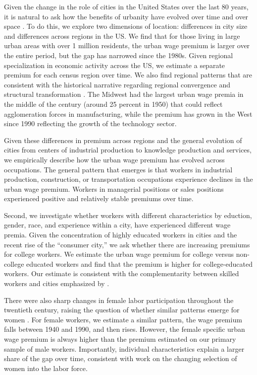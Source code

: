 \documentclass[12pt]{article}
\begin{document}
Given the change in the role of cities in the United States over the last 80 years, it is natural to ask how the benefits of urbanity have evolved over time and over space \citep*{glaeser2003rise,glaeser2004cities, glaeser2008rise,glaeser2010did}.
To do this, we explore two dimensions of location: differences in city size and differences across regions in the US. 
We find that for those living in large urban areas with over 1 million residents, the urban wage premium is larger over the entire period, but the gap has narrowed since the 1980s. 
Given regional specialization in economic activity across the US, we estimate a separate premium for each census region over time.
We also find regional patterns that are consistent with the historical narrative regarding regional convergence and structural transformation \citep{barro1992convergence, kim1998economic, Mitchener_McLean_1999}. 
The Midwest had the largest urban wage premia in the middle of the century (around 25 percent in 1950) that could reflect agglomeration forces in manufacturing, while the premium has grown in the West since 1990 reflecting the growth of the technology sector.

Given these differences in premium across regions and the general evolution of cities from centers of industrial production to knowledge production and services, we empirically describe how the urban wage premium has evolved across occupations.
The general pattern that emerges is that workers in industrial production, construction, or transportation occupations experience declines in the urban wage premium. 
Workers in managerial positions or sales positions experienced positive and relatively stable premiums over time. 

Second, we investigate whether workers with different characteristics by eduction, gender, race, and experience within a city, have experienced different wage premia.  
Given the concentration of highly educated workers in cities and the recent rise of the ``consumer city,'' we ask whether there are increasing premiums for college workers. 
We estimate the urban wage premium for college versus non-college educated workers and find that the premium is higher for college-educated workers. 
Our estimate is consistent with the complementarity between skilled workers and cities emphasized by \citet{moretti2013real}. 

There were also sharp changes in female labor participation throughout the twentieth century, raising the question of whether similar patterns emerge for women \citep{goldin1990understanding}. 
For female workers, we estimate a similar pattern, the wage premium falls between 1940 and 1990, and then rises. 
However, the female specific urban wage premium is always higher than the premium estimated on our primary sample of male workers. 
Importantly, individual characteristics explain a larger share of the gap over time, consistent with work on the changing selection of women into the labor force. 
\end{document}
